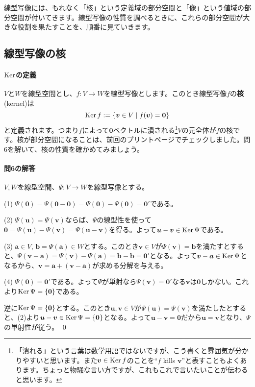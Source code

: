 線型写像には、もれなく「核」という定義域の部分空間と「像」という値域の部分空間が付いてきます。線型写像の性質を調べるときに、これらの部分空間が大きな役割を果たすことを、順番に見ていきます。

\subsection{線型写像の核}

\paragraph{$\operatorname{Ker}$の定義}

$V$と$W$を線型空間とし、$f\colon V\rightarrow W$を線型写像とします。このとき線型写像$f$の\textbf{核}(kernel)は
\[
\operatorname{Ker} f:=\{\boldsymbol{v}\in V\mid f(\boldsymbol{v})=\boldsymbol{0}\}
\]
と定義されます。つまり$f$によって$\bm{0}$ベクトルに潰される\footnote{「潰れる」という言葉は数学用語ではないですが、こう書くと雰囲気が分かりやすいと思います。また$\boldsymbol{v}\in\operatorname{Ker} f$のことを``$f$ kills $\bm{v}$''と表すこともよくあります。ちょっと物騒な言い方ですが、これもこれで言いたいことが伝わると思います。}$V$の元全体が$f$の核です。核が部分空間になることは、前回のプリント\pageref{subsec:kernel}ページでチェックしました。問6を解いて、核の性質を確かめてみましょう。

\paragraph{問6の解答} $V, W$を線型空間、$\Psi\colon V\rightarrow W$を線型写像とする。

\noindent (1) $\Psi(\bm{0}) = \Psi(\bm{0} - \bm{0}) = \Psi(\bm{0}) - \Psi(\bm{0}) = \bm{0}'$である。

\noindent (2) $\Psi(\bm{u}) = \Psi(\bm{v})$ならば、$\Psi$の線型性を使って$\bm{0} = \Psi(\bm{u}) - \Psi(\bm{v}) = \Psi(\bm{u} - \bm{v})$を得る。よって$\boldsymbol{u} - \boldsymbol{v} \in \operatorname{Ker}\Psi$である。

\noindent (3) $\bm{a}\in V$, $\bm{b} = \Psi(\bm{a})\in W$とする。このとき$\bm{v}\in V$が$\Psi(\bm{v}) = \bm{b}$を満たすとすると、$\Psi(\bm{v} - \bm{a}) = \Psi(\bm{v}) - \Psi(\bm{a}) = \bm{b} - \bm{b} = \bm{0}'$となる。よって$\boldsymbol{v} - \boldsymbol{a} \in \operatorname{Ker}\Psi$となるから、$\bm{v} = \bm{a} + (\bm{v} - \bm{a})$が求める分解を与える。

\noindent (4) $\Psi(\bm{0}) = \bm{0}'$である。よって$\Psi$が単射なら$\Psi(\bm{v}) = \bm{0}'$なる$\bm{v}$は$\bm{0}$しかない。これより$\operatorname{Ker}\Psi=\{\boldsymbol{0}\}$である。

逆に$\operatorname{Ker}\Psi = \{\boldsymbol{0}\}$とする。このとき$\bm{u}, \bm{v}\in V$が$\Psi(\bm{u}) = \Psi(\bm{v})$を満たしたとすると、(2)より$\boldsymbol{u} - \boldsymbol{v} \in \operatorname{Ker}\Psi = \{\boldsymbol{0}\}$となる。よって$\bm{u} - \bm{v} = \bm{0}$だから$\bm{u} = \bm{v}$となり、$\Psi$の単射性が従う。 \qed

